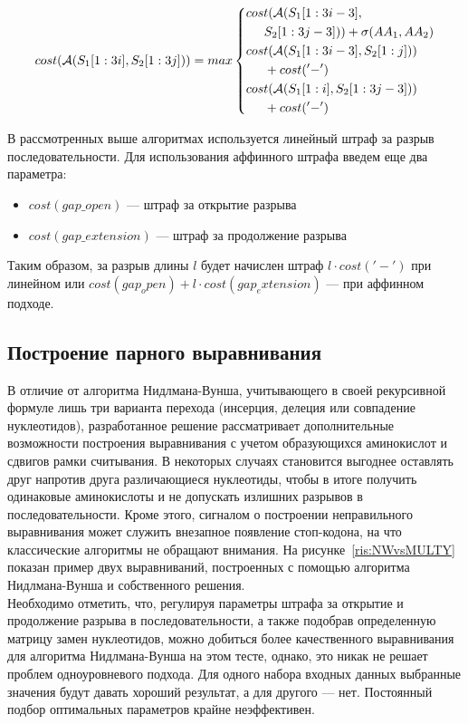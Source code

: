 \begin{equation}\label{eq:AA_2}
cost(\mathcal{A}(S_1[1:3i], S_2[1:3j])) = max\left\{
\begin{aligned}
& cost(\mathcal{A}(S_1[1:3i-3],\\
& \hspace{0.5cm} S_2[1:3j-3])) + \sigma(AA_1, AA_2)\\
& cost(\mathcal{A}(S_1[1:3i-3], S_2[1:j]))\\
& \hspace{0.5cm} + cost('-')\\
& cost(\mathcal{A}(S_1[1:i], S_2[1:3j-3]))\\
& \hspace{0.5cm}  + cost('-')
\end{aligned}
\right.
\end{equation}

В рассмотренных выше алгоритмах используется линейный штраф за разрыв последовательности. Для использования аффинного штрафа введем еще два параметра:
\begin{itemize}
	\item $cost(gap\_open)$ --- штраф за открытие разрыва
	\item $cost(gap\_extension)$ --- штраф за продолжение разрыва
\end{itemize}

\indent Таким образом, за разрыв длины $l$ будет начислен штраф $l\cdot cost('-')$ при линейном или $cost(gap_open) + l\cdot cost(gap_extension)$ --- при аффинном подходе.

\subsection[Построение парного выравнивания]{\large Построение парного выравнивания} \label{PairwiseAlign}
\hspace{\parindent} В отличие от алгоритма Нидлмана-Вунша, учитывающего в своей рекурсивной формуле лишь три варианта перехода (инсерция, делеция или совпадение нуклеотидов), разработанное решение рассматривает дополнительные возможности построения выравнивания с учетом образующихся аминокислот и сдвигов рамки считывания. В некоторых случаях становится выгоднее оставлять друг напротив друга различающиеся нуклеотиды, чтобы в итоге получить одинаковые аминокислоты и не допускать излишних разрывов в последовательности. Кроме этого, сигналом о построении неправильного выравнивания может служить внезапное появление стоп-кодона, на что классические алгоритмы не обращают внимания. На рисунке~\ref{ris:NWvsMULTY} показан пример двух выравниваний, построенных с помощью алгоритма Нидлмана-Вунша и собственного решения. \\
\indent Необходимо отметить, что, регулируя параметры штрафа за открытие и продолжение разрыва в последовательности, а также подобрав определенную матрицу замен нуклеотидов, можно добиться более качественного выравнивания для алгоритма Нидлмана-Вунша на этом тесте, однако, это никак не решает проблем одноуровневого подхода. Для одного набора входных данных выбранные значения будут давать хороший результат, а для другого --- нет. Постоянный подбор оптимальных параметров крайне неэффективен.

